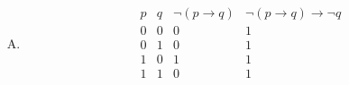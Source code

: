 {{\begin{practices}
\begin{enumerate}[A.]
{\begin{table}[H]
\[\begin{array}{c|c|c|c}
                                \hline
                                p & q & \neg (p \rightarrow q) & \neg (p \rightarrow q) \rightarrow p \\
                                \hline
                                0 & 0 & 0 & 1 \\
                                0 & 1 & 0 & 1 \\
                                1 & 0 & 1 & 1 \\
                                1 & 1 & 0 & 1 \\
                            \end{array}
                        \]
                    \end{table}
                }
                \item
                {
                    \begin{table}[H]
                        \[
                            \begin{array}{c|c|c|c}
                                \hline
                                p & q & \neg (p \rightarrow q) & \neg (p \rightarrow q) \rightarrow \neg q \\
                                \hline
                                0 & 0 & 0 & 1 \\
                                0 & 1 & 0 & 1 \\
                                1 & 0 & 1 & 1 \\
                                1 & 1 & 0 & 1 \\
                            \end{array}
                        \]
                    \end{table}
                }
            \end{enumerate}
        \end{practices}

}}
